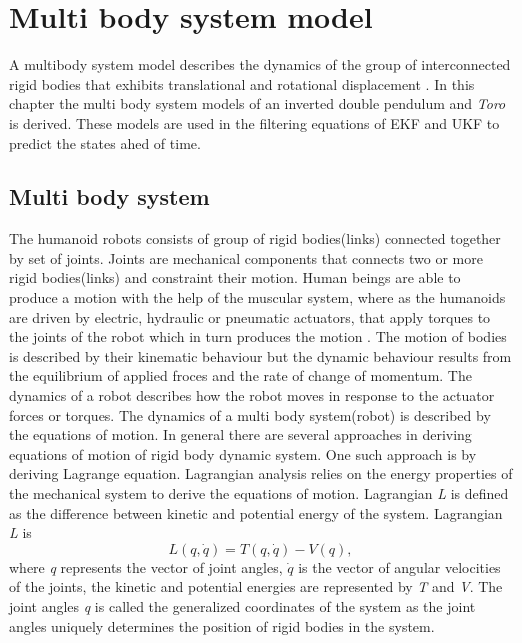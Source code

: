 \chapter{Multi body system model}
\label{ch:multi_mdl}
A multibody system model describes the dynamics of the group of interconnected rigid bodies that exhibits translational and rotational displacement \citep{mur94}. In this chapter the multi body system models of an inverted double pendulum and \emph{Toro} is derived. These models are used in the filtering equations of EKF and UKF to predict the states ahed of time.
\section{Multi body system}
The humanoid robots consists of group of rigid bodies(links) connected together by set of joints. Joints are mechanical components that connects two or more rigid bodies(links) and constraint their motion. Human beings are able to produce a motion with the help of the muscular system, where as the humanoids are driven by electric, hydraulic or pneumatic actuators, that apply torques to the joints of the robot which in turn produces the motion \cite[Chapter 2]{mur94}. The motion of bodies is described by their kinematic behaviour but the dynamic behaviour results from the equilibrium of applied froces and the rate of change of momentum. The dynamics of a robot describes how the robot moves in response to the actuator forces or torques. The dynamics of a multi body system(robot) is described by the equations of motion. In general there are several approaches in deriving equations of motion of rigid body dynamic system. One such approach is by deriving Lagrange equation. Lagrangian analysis relies on the energy properties of the mechanical system to derive the equations of motion. Lagrangian \emph{L} is defined as the difference between kinetic and potential energy of the system. Lagrangian \emph{L} is $$ L(q,\dot{q}) = T(q,\dot{q}) - V(q),$$ 
where \emph{q} represents the vector of joint angles, $\dot{q}$ is the vector of angular velocities of the joints, the kinetic and potential energies are represented by \emph{T} and \emph{V}. The joint angles \emph{q} is called the generalized coordinates of the system as the joint angles uniquely determines the position of rigid bodies in the system.

